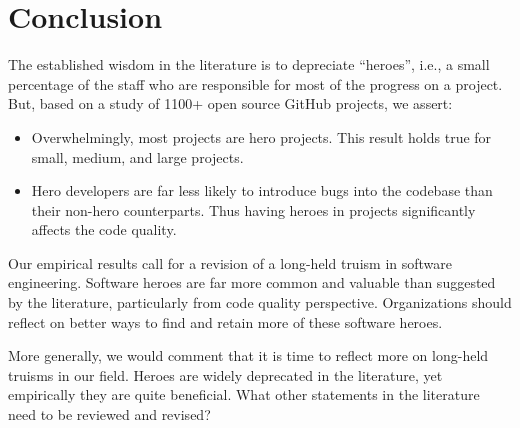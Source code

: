 \documentclass[sigconf,review]{acmart}
\newcommand{\bi}{\begin{itemize}}
\newcommand{\ei}{\end{itemize}}
\begin{document}
 
\section{Conclusion}
\label{sec:Conclusion}

The established wisdom in the literature is to depreciate ``heroes'',
i.e., a small percentage of the staff who are responsible for most of the progress on a project.
But, based on a study of 1100+ open source GitHub projects,
we assert:
\bi
\item  Overwhelmingly, most projects are hero projects.
This result holds true for small, medium, and large projects.
\item   Hero developers are far less likely to introduce bugs into the codebase than their non-hero counterparts. Thus having heroes in projects significantly affects the code quality.
\ei
Our empirical results call for a revision of a long-held truism in software engineering.
Software heroes are far more common and valuable than suggested by the literature,
particularly from code quality perspective. Organizations should reflect on better ways
to find and retain more of these software heroes.

More generally, we would  comment that  it is time
to reflect more on long-held truisms in our field. Heroes are widely deprecated in the literature, yet empirically they are quite beneficial. 
 What other statements in the literature need to be
reviewed and revised?



\end{document}
